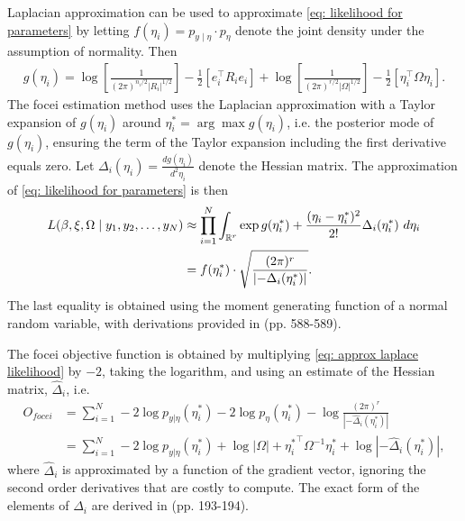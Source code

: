 Laplacian approximation can be used to approximate \eqref{eq: likelihood for parameters} by letting $f(\eta_i)=p_{y\mid  \eta}\cdot p_\eta$ denote the joint density under the assumption of normality. Then
\begin{align*}
    g(\eta_i)=\log\left[\frac{1}{(2\pi)^{n_i/2}|R_i|^{1/2}}\right]-\frac{1}{2}\left[e_i^\top R_i e_i\right] + \log \left[\frac{1}{(2\pi)^{r/2}|\Omega|^{1/2}}\right] -\frac{1}{2}\left[\eta_i^\top \Omega \eta_i\right].
\end{align*}
The focei estimation method uses the Laplacian approximation with a Taylor expansion of $g(\eta_i)$ around $\eta_i^\ast = \arg \max g(\eta_i)$, i.e. the posterior mode of $g(\eta_i)$, ensuring the term of the Taylor expansion including the first derivative equals zero. Let $\Delta_i(\eta_i)=\frac{d g(\eta_i)}{d^2 \eta_i}$ denote the Hessian matrix.
The approximation of \eqref{eq: likelihood for parameters} is then
\begin{align}
    L(\beta,\xi,\Omega\mid  y_1,y_2,\dots,y_N)&\approx \prod_{i=1}^N\int_{\mathbb{R}^r} \exp g(\eta_i^\ast) +\frac{(\eta_i-\eta_i^\ast)^2}{2!} \Delta_i(\eta_i^\ast)\ d\eta_i \nonumber \\
    &= f(\eta_i^\ast) \cdot \sqrt{\frac{(2\pi)^r}{\left|-\Delta_i(\eta_i^\ast)\right|}}.\label{eq: approx laplace likelihood}
\end{align}
The last equality is obtained using the moment generating function of a normal random variable, with derivations provided in \cite{Wang2007} (pp. 588-589). 

The focei objective function is obtained by multiplying \eqref{eq: approx laplace likelihood} by $-2$, taking the logarithm, and using an estimate of the Hessian matrix, $\hat\Delta_i$, i.e.
\begin{align*}
    O_{focei}&=\sum_{i=1}^N -2\log p_{y|\eta}(\eta_i^\ast)-2\log p_\eta(\eta_i^\ast)-\log \frac{(2\pi)^r}{\left|-\hat\Delta_i(\eta_i^\ast)\right|}\\
    &= \sum_{i=1}^N-2\log p_{y|\eta}(\eta_i^\ast) +\log|\Omega|+{\eta_i^\ast}^\top \Omega^{-1} \eta_i^\ast +\log \left|-\hat\Delta_i(\eta_i^\ast)\right|,
\end{align*}
where $\hat\Delta_i$ is approximated 
by a function of the gradient vector, ignoring the second order derivatives that are costly to compute. The exact form of the elements of $\hat\Delta_i$ are derived in \cite{Almquist2015} (pp. 193-194).


